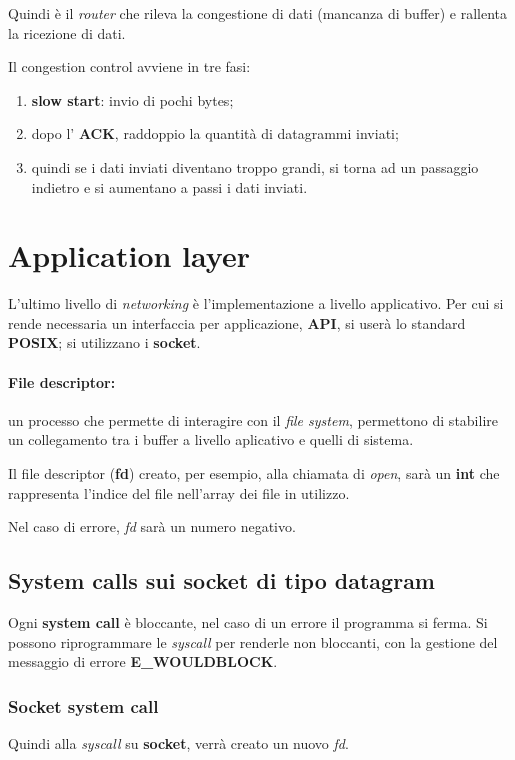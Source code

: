 Quindi è il \emph{router} che rileva la congestione di dati (mancanza di
buffer) e rallenta la ricezione di dati.

Il congestion control avviene in tre fasi:
\begin{enumerate}
  \item \textbf{slow start}: invio di pochi bytes;
  \item dopo l' \textbf{ACK}, raddoppio la quantità di datagrammi inviati;
  \item quindi se i dati inviati diventano troppo grandi, si torna ad un
    passaggio indietro e si aumentano a passi i dati inviati.
\end{enumerate}

\section{Application layer}
L'ultimo livello di \emph{networking} è l'implementazione a livello
applicativo.
Per cui si rende necessaria un interfaccia per applicazione, \textbf{API}, si
userà lo standard \textbf{POSIX}; si utilizzano i \textbf{socket}.

\paragraph{File descriptor:}
un processo che permette di interagire con il \textit{file system}, permettono
di stabilire un collegamento tra i buffer a livello aplicativo e quelli di
sistema.

Il file descriptor (\textbf{fd}) creato, per esempio, alla chiamata di \textit{open},
sarà un \textbf{int} che rappresenta l'indice del file nell'array dei file
in utilizzo.

Nel caso di errore, \emph{fd} sarà un numero negativo.

\subsection{System calls sui socket di tipo datagram}
Ogni \textbf{system call} è bloccante, nel caso di un errore il programma si
ferma.
Si possono riprogrammare le \emph{syscall} per renderle non bloccanti, con la
gestione del messaggio di errore \textbf{E\_WOULDBLOCK}.

\subsubsection{Socket system call}
Quindi alla \textit{syscall} su \textbf{socket}, verrà creato un nuovo \emph{
fd}.

